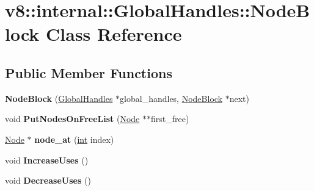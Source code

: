 \hypertarget{classv8_1_1internal_1_1GlobalHandles_1_1NodeBlock}{}\section{v8\+:\+:internal\+:\+:Global\+Handles\+:\+:Node\+Block Class Reference}
\label{classv8_1_1internal_1_1GlobalHandles_1_1NodeBlock}
\subsection*{Public Member Functions}
\begin{DoxyCompactItemize}
\item 
\mbox{\label{classv8_1_1internal_1_1GlobalHandles_1_1NodeBlock_a6f3f4ad3ad8fc3185ef080d710d900c0}} 
{\bfseries Node\+Block} (\mbox{\hyperlink{classv8_1_1internal_1_1GlobalHandles}{Global\+Handles}} $\ast$global\+\_\+handles, \mbox{\hyperlink{classv8_1_1internal_1_1GlobalHandles_1_1NodeBlock}{Node\+Block}} $\ast$next)
\item 
\mbox{\label{classv8_1_1internal_1_1GlobalHandles_1_1NodeBlock_afa818cdc0b3346f12e42304c4f358ad3}} 
void {\bfseries Put\+Nodes\+On\+Free\+List} (\mbox{\hyperlink{classv8_1_1internal_1_1GlobalHandles_1_1Node}{Node}} $\ast$$\ast$first\+\_\+free)
\item 
\mbox{\label{classv8_1_1internal_1_1GlobalHandles_1_1NodeBlock_ac98e55ac69269c50d8ecc233e670081c}} 
\mbox{\hyperlink{classv8_1_1internal_1_1GlobalHandles_1_1Node}{Node}} $\ast$ {\bfseries node\+\_\+at} (\mbox{\hyperlink{classint}{int}} index)
\item 
\mbox{\label{classv8_1_1internal_1_1GlobalHandles_1_1NodeBlock_aaffc8a8a872d639fcdc3376f4cbaac3f}} 
void {\bfseries Increase\+Uses} ()
\item 
\mbox{\label{classv8_1_1internal_1_1GlobalHandles_1_1NodeBlock_ab9a674fa6b8d63412c9933d2f7f81d80}} 
void {\bfseries Decrease\+Uses} ()
\item 
\mbox{\label{classv8_1_1internal_1_1GlobalHandles_1_1NodeBlock_a0e667a118ed6a7f2d62dbc23cbed58a1}} 
$$
\end{DoxyCompactItemize}
